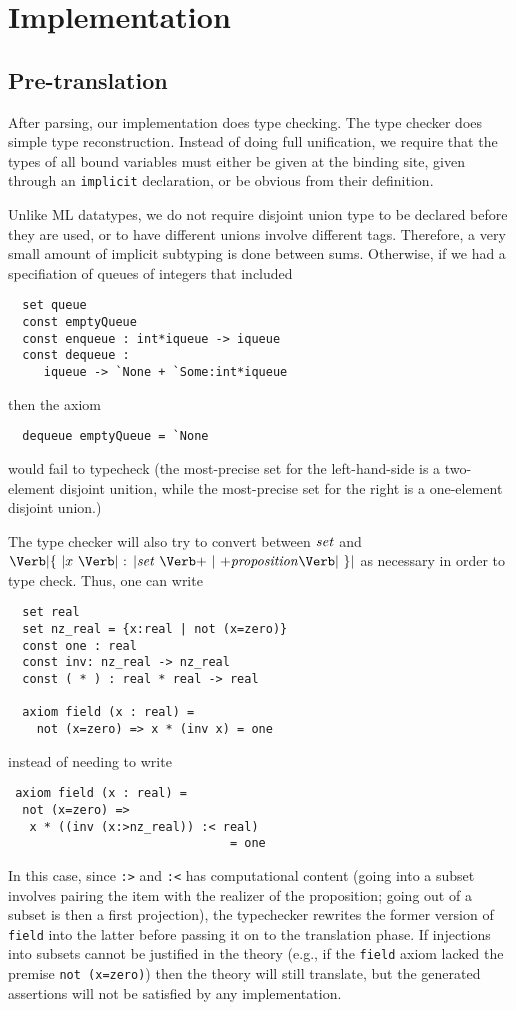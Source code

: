 
\section{Implementation}
\label{sec:implementation}

\subsection{Pre-translation}

After parsing, our implementation does type checking.  The type
checker does simple type reconstruction.  Instead of doing full
unification, we require that the types of all bound variables must
either be given at the binding site, given through an \Verb|implicit|
declaration, or be obvious from their definition.  

Unlike ML datatypes, we do not require disjoint union type
to be declared before they are used, or to have different unions
involve different tags.  Therefore, a very small amount of implicit 
subtyping is done between sums.  Otherwise, if we had a
specifiation of queues of integers that included
\begin{Verbatim}
  set queue
  const emptyQueue
  const enqueue : int*iqueue -> iqueue
  const dequeue : 
     iqueue -> `None + `Some:int*iqueue
\end{Verbatim}
then the axiom
\begin{Verbatim}
  dequeue emptyQueue = `None
\end{Verbatim}
would fail to typecheck (the most-precise set for the left-hand-side
is a two-element disjoint unition, while the most-precise set
for the right is a one-element disjoint union.)

The type checker will also try to convert between $\mbox{\textit{set}}$ and $\LBRACE
x \ \COLON \Setexp\ \BAR \Proposition \RBRACE$ as necessary in order
to type check.  Thus, one can write
\begin{Verbatim}
  set real
  set nz_real = {x:real | not (x=zero)}
  const one : real
  const inv: nz_real -> nz_real
  const ( * ) : real * real -> real

  axiom field (x : real) =
    not (x=zero) => x * (inv x) = one
\end{Verbatim}
instead of needing to write
\begin{Verbatim}
 axiom field (x : real) =
  not (x=zero) => 
   x * ((inv (x:>nz_real)) :< real)
                               = one
\end{Verbatim}
In this case, since \Verb|:>| and \Verb|:<| has computational content
(going into a subset involves pairing the item with the realizer of
the proposition; going out of a subset is then a first projection),
the typechecker rewrites the former version of \Verb|field| into the
latter before passing it on to the translation phase. If injections
into subsets cannot be justified in the theory (e.g., if the
\Verb|field| axiom lacked the premise \Verb|not (x=zero)|) then the
theory will still translate, but the generated assertions will not be
satisfied by any implementation.

